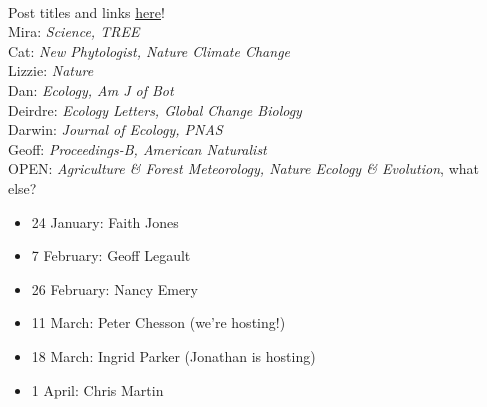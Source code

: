\documentclass[11pt]{article}
\newenvironment{smitemize}{
\begin{itemize}
  \setlength{\itemsep}{0pt}
  \setlength{\parskip}{0.8pt}
  \setlength{\parsep}{0pt}}
{\end{itemize}
}
\begin{document}
\vspace{7pt}\\
 Post titles and links \href{https://docs.google.com/document/d/1j0WdDbjdp8ERLSO7whvtnP-tOblYMlX33TSCXy_uRKo/edit?usp=sharing}{\underline{here}}!\\
Mira: \emph{Science, TREE} \\
Cat: \emph{New Phytologist, Nature Climate Change}\\
Lizzie: \emph{Nature}\\
Dan: \emph{Ecology, Am J of Bot }\\
Deirdre: \emph{Ecology Letters, Global Change Biology}\\
Darwin: \emph{Journal of Ecology, PNAS}\\
Geoff: \emph{Proceedings-B, American Naturalist} \\
OPEN: \emph{Agriculture \& Forest Meteorology, Nature Ecology \& Evolution}, what else?\\

\vspace{-1ex}
\begin{smitemize}
\item 24 January: Faith Jones
\item 7 February: Geoff Legault
\item 26 February: Nancy Emery
\item 11 March: Peter Chesson (we're hosting!)
\item 18 March: Ingrid Parker (Jonathan is hosting)
\item 1 April: Chris Martin
\end{smitemize}
\end{document}
